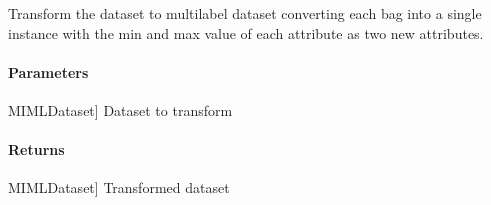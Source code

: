 \documentclass[letterpaper,10pt,english]{sphinxmanual}
\begin{document}
\begin{fulllineitems}
\begin{fulllineitems}
\begin{description}
\end{description}

\end{fulllineitems}


\begin{fulllineitems}
\label{\detokenize{transformation/mimlTOml/_autosummary/miml.transformation.mimlTOml.minmax.MinMaxTransformation:miml.transformation.mimlTOml.minmax.MinMaxTransformation.transform_dataset}}
\pysigstartsignatures
{}
\pysigstopsignatures
\sphinxAtStartPar
Transform the dataset to multilabel dataset converting each bag into a single instance with the min and max
value of each attribute as two new attributes.


\paragraph{Parameters}
\label{\detokenize{transformation/mimlTOml/_autosummary/miml.transformation.mimlTOml.minmax.MinMaxTransformation:id1}}\begin{description}
\sphinxlineitem{dataset}{[}MIMLDataset{]}
\sphinxAtStartPar
Dataset to transform

\end{description}


\paragraph{Returns}
\label{\detokenize{transformation/mimlTOml/_autosummary/miml.transformation.mimlTOml.minmax.MinMaxTransformation:id2}}\begin{description}
\sphinxlineitem{transformed\_dataset}{[}MIMLDataset{]}
\sphinxAtStartPar
Transformed dataset

\end{description}

\end{fulllineitems}


\end{fulllineitems}
\end{document}
